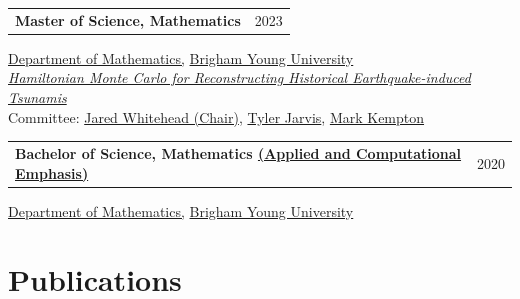 \documentclass[a4paper,12pt]{article}
\begin{document}
\begin{tabularx}{\linewidth}{@{}X r@{}}
\textbf{Master of Science, Mathematics} & 2023 \\
\end{tabularx}
\href{https://math.byu.edu}{Department of Mathematics,} \href{https://byu.edu}{Brigham Young University}\\
\textit{\href{https://scholarsarchive.byu.edu/etd/9950/}{Hamiltonian Monte Carlo for Reconstructing Historical Earthquake-induced Tsunamis}} \\
Committee: \href{https://scholar.google.com/citations?user=lLR_YEYAAAAJ&hl=en}{Jared Whitehead (Chair)}, \href{https://scholar.google.com/citations?user=jbGAxasAAAAJ&hl=en}{Tyler Jarvis}, \href{https://scholar.google.com/citations?user=cTP2k9kAAAAJ&hl=en}{Mark Kempton}

\begin{tabularx}{\linewidth}{@{}X r@{}}
\textbf{Bachelor of Science, Mathematics \href{https://acme.byu.edu}{(Applied and Computational Emphasis)}} & 2020 \\
\end{tabularx}
\href{https://math.byu.edu}{Department of Mathematics,} \href{https://byu.edu}{Brigham Young University}


\section{Publications}
\end{document}
